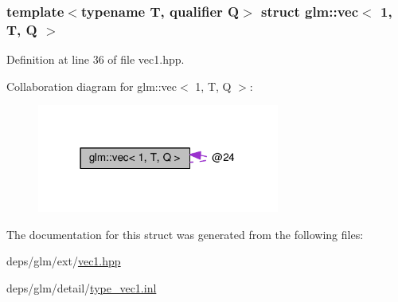 \subsubsection*{template$<$typename T, qualifier Q$>$\newline
struct glm\+::vec$<$ 1, T, Q $>$}



Definition at line 36 of file vec1.\+hpp.



Collaboration diagram for glm\+:\+:vec$<$ 1, T, Q $>$\+:
\nopagebreak
\begin{figure}[H]
\begin{center}
\leavevmode
\includegraphics[width=226pt]{d3/d65/structglm_1_1vec_3_011_00_01T_00_01Q_01_4__coll__graph}
\end{center}
\end{figure}


The documentation for this struct was generated from the following files\+:\begin{DoxyCompactItemize}
\item 
deps/glm/ext/\hyperlink{ext_2vec1_8hpp}{vec1.\+hpp}\item 
deps/glm/detail/\hyperlink{type__vec1_8inl}{type\+\_\+vec1.\+inl}\end{DoxyCompactItemize}

